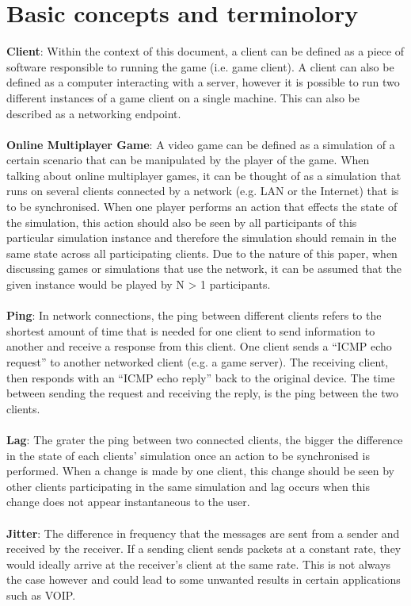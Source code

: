 \chapter{Basic concepts and terminolory}\label{app:terms}
\textbf{Client}: Within the context of this document, a client can be defined as a piece of software responsible to running the game (i.e. game client). A client can also be defined as a computer interacting with a server, however it is possible to run two different instances of a game client on a single machine. This can also be described as a networking endpoint.
\\
\\
\textbf{Online Multiplayer Game}: A video game can be defined as a simulation of a certain scenario that can be manipulated by the player of the game. When talking about online multiplayer games, it can be thought of as a simulation that runs on several clients connected by a network (e.g. LAN or the Internet) that is to be synchronised. When one player performs an action that effects the state of the simulation, this action should also be seen by all participants of this particular simulation instance and therefore the simulation should remain in the same state across all participating clients. Due to the nature of this paper, when discussing games or simulations that use the network, it can be assumed that the given instance would be played by N > 1 participants.
\\
\\
\textbf{Ping}: In network connections, the ping between different clients refers to the shortest amount of time that is needed for one client to send information to another and receive a response from this client. One client sends a ``ICMP echo request'' to another networked client (e.g. a game server). The receiving client, then responds with an ``ICMP echo reply'' back to the original device. The time between sending the request and receiving the reply, is the ping between the two clients.
\\
\\
\textbf{Lag}: The grater the ping between two connected clients, the bigger the difference in the state of each clients' simulation once an action to be synchronised is performed. When a change is made by one client, this change should be seen by other clients participating in the same simulation and lag occurs when this change does not appear instantaneous to the user.
\\
\\
\textbf{Jitter}: The difference in frequency that the messages are sent from a sender and received by the receiver. If a sending client sends packets at a constant rate, they would ideally arrive at the receiver's client at the same rate. This is not always the case however and could lead to some unwanted results in certain applications such as VOIP.


